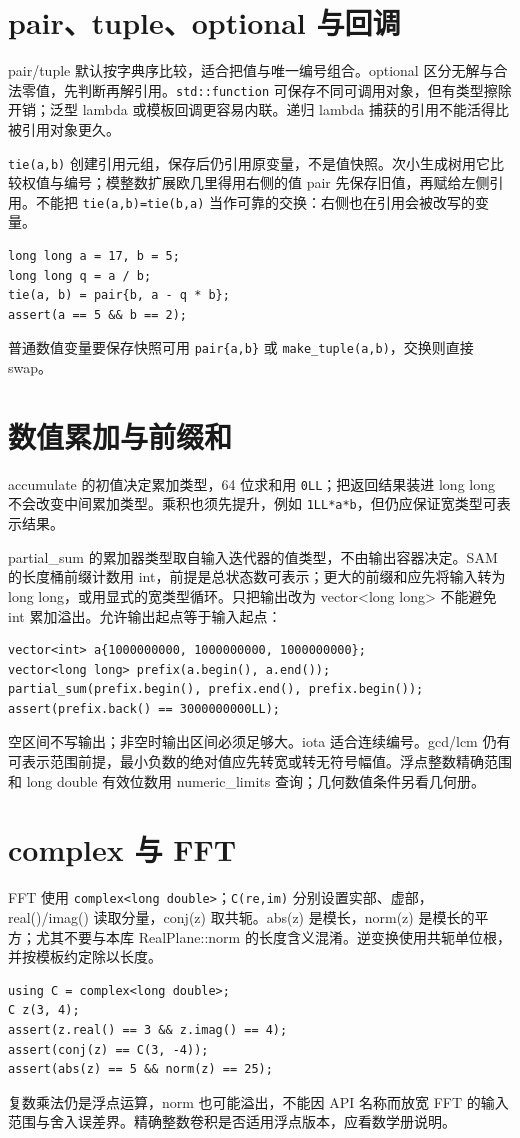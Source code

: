 \section{pair、tuple、optional 与回调}
pair/tuple 默认按字典序比较，适合把值与唯一编号组合。optional 区分无解与合法零值，先判断再解引用。\texttt{std::function} 可保存不同可调用对象，但有类型擦除开销；泛型 lambda 或模板回调更容易内联。递归 lambda 捕获的引用不能活得比被引用对象更久。

\texttt{tie(a,b)} 创建引用元组，保存后仍引用原变量，不是值快照。次小生成树用它比较权值与编号；模整数扩展欧几里得用右侧的值 pair 先保存旧值，再赋给左侧引用。不能把 \texttt{tie(a,b)=tie(b,a)} 当作可靠的交换：右侧也在引用会被改写的变量。
\begin{lstlisting}
long long a = 17, b = 5;
long long q = a / b;
tie(a, b) = pair{b, a - q * b};
assert(a == 5 && b == 2);
\end{lstlisting}
普通数值变量要保存快照可用 \texttt{pair\{a,b\}} 或 \texttt{make\_tuple(a,b)}，交换则直接 swap。

\section{数值累加与前缀和}
accumulate 的初值决定累加类型，64 位求和用 \texttt{0LL}；把返回结果装进 long long 不会改变中间累加类型。乘积也须先提升，例如 \texttt{1LL*a*b}，但仍应保证宽类型可表示结果。

partial\_sum 的累加器类型取自输入迭代器的值类型，不由输出容器决定。SAM 的长度桶前缀计数用 int，前提是总状态数可表示；更大的前缀和应先将输入转为 long long，或用显式的宽类型循环。只把输出改为 vector<long long> 不能避免 int 累加溢出。允许输出起点等于输入起点：
\begin{lstlisting}
vector<int> a{1000000000, 1000000000, 1000000000};
vector<long long> prefix(a.begin(), a.end());
partial_sum(prefix.begin(), prefix.end(), prefix.begin());
assert(prefix.back() == 3000000000LL);
\end{lstlisting}
空区间不写输出；非空时输出区间必须足够大。iota 适合连续编号。gcd/lcm 仍有可表示范围前提，最小负数的绝对值应先转宽或转无符号幅值。浮点整数精确范围和 long double 有效位数用 numeric\_limits 查询；几何数值条件另看几何册。

\section{complex 与 FFT}
FFT 使用 \texttt{complex<long double>}；\texttt{C(re,im)} 分别设置实部、虚部，real()/imag() 读取分量，conj(z) 取共轭。abs(z) 是模长，norm(z) 是模长的平方；尤其不要与本库 RealPlane::norm 的长度含义混淆。逆变换使用共轭单位根，并按模板约定除以长度。
\begin{lstlisting}
using C = complex<long double>;
C z(3, 4);
assert(z.real() == 3 && z.imag() == 4);
assert(conj(z) == C(3, -4));
assert(abs(z) == 5 && norm(z) == 25);
\end{lstlisting}
复数乘法仍是浮点运算，norm 也可能溢出，不能因 API 名称而放宽 FFT 的输入范围与舍入误差界。精确整数卷积是否适用浮点版本，应看数学册说明。


